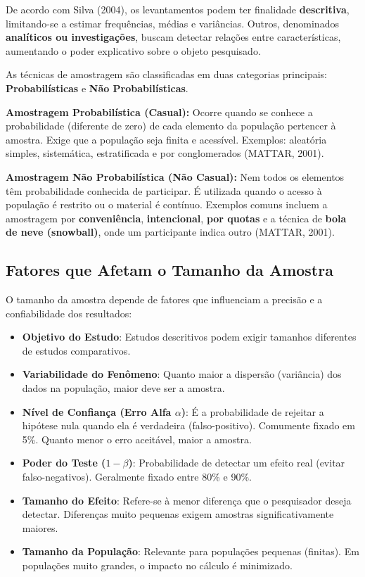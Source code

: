 De acordo com Silva (2004), os levantamentos podem ter finalidade \textbf{descritiva}, limitando-se a estimar frequências, médias e variâncias. Outros, denominados \textbf{analíticos ou investigações}, buscam detectar relações entre características, aumentando o poder explicativo sobre o objeto pesquisado. \vskip0.3cm

As técnicas de amostragem são classificadas em duas categorias principais: \textbf{Probabilísticas} e \textbf{Não Probabilísticas}.
\vskip0.3cm

\textbf{Amostragem Probabilística (Casual):} Ocorre quando se conhece a probabilidade (diferente de zero) de cada elemento da população pertencer à amostra. Exige que a população seja finita e acessível. Exemplos: aleatória simples, sistemática, estratificada e por conglomerados (MATTAR, 2001). 

\vskip0.3cm

\textbf{Amostragem Não Probabilística (Não Casual):} Nem todos os elementos têm probabilidade conhecida de participar. É utilizada quando o acesso à população é restrito ou o material é contínuo. Exemplos comuns incluem a amostragem por \textbf{conveniência}, \textbf{intencional}, \textbf{por quotas} e a técnica de \textbf{bola de neve (snowball)}, onde um participante indica outro (MATTAR, 2001). \vskip0.3cm

\subsection{Fatores que Afetam o Tamanho da Amostra} 

O tamanho da amostra depende de fatores que influenciam a precisão e a confiabilidade dos resultados:

\begin{itemize}
    \item \textbf{Objetivo do Estudo}: Estudos descritivos podem exigir tamanhos diferentes de estudos comparativos.
    \item \textbf{Variabilidade do Fenômeno}: Quanto maior a dispersão (variância) dos dados na população, maior deve ser a amostra.
    \item \textbf{Nível de Confiança (Erro Alfa $\alpha$)}: É a probabilidade de rejeitar a hipótese nula quando ela é verdadeira (falso-positivo). Comumente fixado em 5\%. Quanto menor o erro aceitável, maior a amostra.
    \item \textbf{Poder do Teste ($1-\beta$)}: Probabilidade de detectar um efeito real (evitar falso-negativos). Geralmente fixado entre 80\% e 90\%. 
    \item \textbf{Tamanho do Efeito}: Refere-se à menor diferença que o pesquisador deseja detectar. Diferenças muito pequenas exigem amostras significativamente maiores.
    \item \textbf{Tamanho da População}: Relevante para populações pequenas (finitas). Em populações muito grandes, o impacto no cálculo é minimizado.
\end{itemize}

